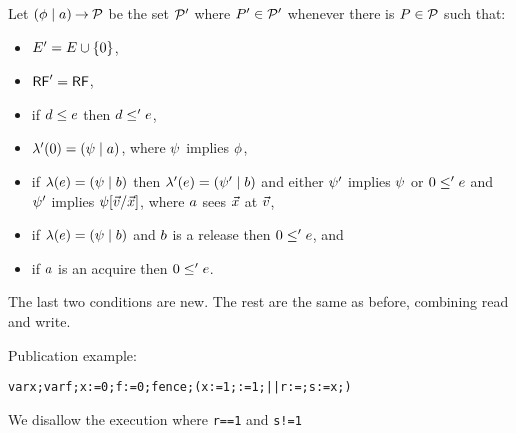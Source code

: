 Let $(\phi \mid a) \mathbin\rightarrow \mathcal{P}$ be the set $\mathcal{P}'$ where
$P'\in\mathcal{P}'$ whenever there is $P\in\mathcal{P}$ such that:
\begin{itemize}
\item $E' = E \cup \{0\}$,
\item $\mathsf{RF}' = \mathsf{RF}$,
\item if $d \le e$ then $d \le' e$,
\item $\lambda'(0) = (\psi \mid a)$, where $\psi$ implies $\phi$, 
\item if $\lambda(e) = (\psi \mid b)$ then
  $\lambda'(e) = (\psi' \mid b)$ and either $\psi'$ implies
  $\psi$ or
  $0 \le' e$ and $\psi'$ implies $\psi[\vec{v}/\vec{x}]$,
  where $a$ sees $\vec{x}$ at $\vec{v}$,
\item if $\lambda(e) = (\psi \mid b)$ and $b$ is a release then $0
  \le' e$, and
\item if $a$ is an acquire then $0 \le' e$.  
\end{itemize}
The last two conditions are new.  The rest are the same as before, combining
read and write.   



Publication example:
\begin{alltt}
    var x; var f; x:=0; f:=0; fence; (x:=1; :=1;  ||  r:=; s:=x;)
\end{alltt}
We disallow the execution where \texttt{r==1} and \texttt{s!=1}

